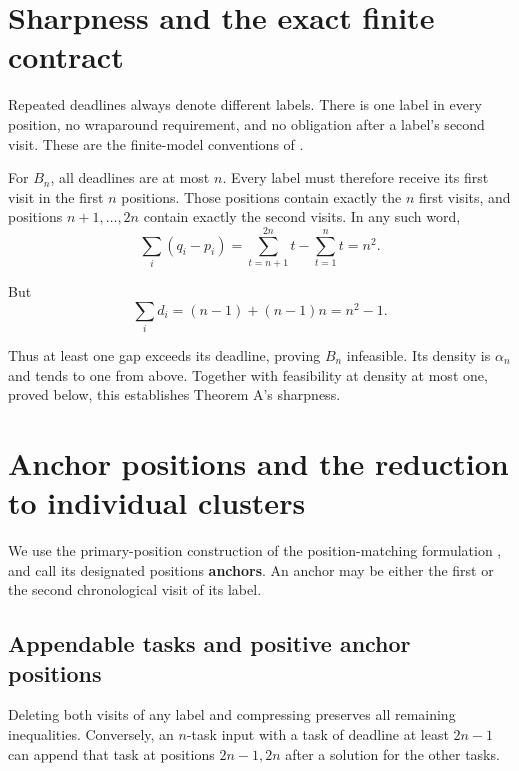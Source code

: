 \documentclass[11pt,a4paper]{article}
\begin{document}
\hypertarget{sharpness-and-the-exact-finite-contract}{%
\section{Sharpness and the exact finite contract}\label{sharpness-and-the-exact-finite-contract}}

Repeated deadlines always denote different labels. There is one label in every position, no wraparound requirement, and no obligation after a label's second visit. These are the finite-model conventions of \cite{ref:KPK+26,ref:KMPT26}.

For \(B_n\), all deadlines are at most \(n\). Every label must therefore receive its first visit in the first \(n\) positions. Those positions contain exactly the \(n\) first visits, and positions \(n+1,\ldots,2n\) contain exactly the second visits. In any such word,
\[
\sum_i(q_i-p_i)
=\sum_{t=n+1}^{2n}t-\sum_{t=1}^n t=n^2.
\]

But
\[
\sum_i d_i=(n-1)+(n-1)n=n^2-1.
\]

Thus at least one gap exceeds its deadline, proving \(B_n\) infeasible. Its density is \(\alpha_n\) and tends to one from above. Together with feasibility at density at most one, proved below, this establishes Theorem A's sharpness.

\hypertarget{anchor-positions-and-the-reduction-to-individual-clusters}{%
\section{Anchor positions and the reduction to individual clusters}\label{anchor-positions-and-the-reduction-to-individual-clusters}}

We use the primary-position construction of the position-matching formulation \cite{ref:KPK+26}, and call its designated positions \textbf{anchors}. An anchor may be either the first or the second chronological visit of its label.

\hypertarget{appendable-tasks-and-positive-anchor-positions}{%
\subsection{Appendable tasks and positive anchor positions}\label{appendable-tasks-and-positive-anchor-positions}}

Deleting both visits of any label and compressing preserves all remaining inequalities. Conversely, an \(n\)-task input with a task of deadline at least \(2n-1\) can append that task at positions \(2n-1,2n\) after a solution for the other tasks.
\end{document}
